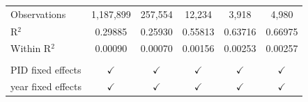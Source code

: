 \begin{tabular}{lccccc}
    \\
   Observations        & 1,187,899       & 257,554        & 12,234        & 3,918         & 4,980\\  
   R$^2$               & 0.29885         & 0.25930        & 0.55813       & 0.63716       & 0.66975\\  
   Within R$^2$        & 0.00090         & 0.00070        & 0.00156       & 0.00253       & 0.00257\\  
    \\
   PID fixed effects   & $\checkmark$    & $\checkmark$   & $\checkmark$  & $\checkmark$  & $\checkmark$\\   
   year fixed effects  & $\checkmark$    & $\checkmark$   & $\checkmark$  & $\checkmark$  & $\checkmark$\\   
   \bottomrule
\end{tabular}
\par\endgroup


